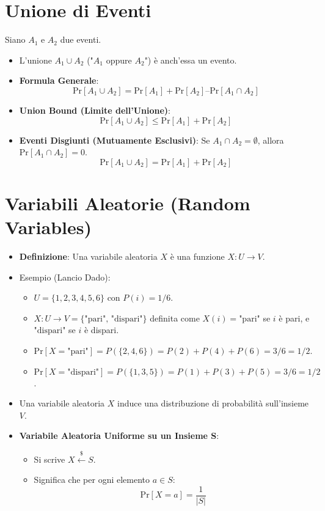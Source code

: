 \documentclass{article}
\begin{document}
\section{Unione di Eventi}
Siano $A_1$ e $A_2$ due eventi.
\begin{itemize}
    \item L'unione $A_1 \cup A_2$ ("$A_1$ oppure $A_2$") è anch'essa un evento.
    \item \textbf{Formula Generale}:
    \[ \text{Pr}[A_1 \cup A_2] = \text{Pr}[A_1] + \text{Pr}[A_2] – \text{Pr}[A_1 \cap A_2] \]
    \item \textbf{Union Bound (Limite dell'Unione)}:
    \[ \text{Pr}[A_1 \cup A_2] \le \text{Pr}[A_1] + \text{Pr}[A_2] \]
    \item \textbf{Eventi Disgiunti (Mutuamente Esclusivi)}: Se $A_1 \cap A_2 = \emptyset$, allora $\text{Pr}[A_1 \cap A_2] = 0$.
    \[ \text{Pr}[A_1 \cup A_2] = \text{Pr}[A_1] + \text{Pr}[A_2] \]
\end{itemize}

\section{Variabili Aleatorie (Random Variables)}
\begin{itemize}
    \item \textbf{Definizione}: Una variabile aleatoria $X$ è una funzione $X : U \to V$.
    \item Esempio (Lancio Dado):
    \begin{itemize}
        \item $U = \{1, 2, 3, 4, 5, 6\}$ con $P(i) = 1/6$.
        \item $X: U \to V=\{\text{"pari", "dispari"}\}$ definita come $X(i) = \text{"pari"}$ se $i$ è pari, e $\text{"dispari"}$ se $i$ è dispari.
        \item $\text{Pr}[X=\text{"pari"}] = P(\{2, 4, 6\}) = P(2)+P(4)+P(6) = 3/6 = 1/2$.
        \item $\text{Pr}[X=\text{"dispari"}] = P(\{1, 3, 5\}) = P(1)+P(3)+P(5) = 3/6 = 1/2$.
    \end{itemize}
    \item Una variabile aleatoria $X$ induce una distribuzione di probabilità sull'insieme $V$.
    \item \textbf{Variabile Aleatoria Uniforme su un Insieme S}:
    \begin{itemize}
        \item Si scrive $X \stackrel{\$}{\leftarrow} S$.
        \item Significa che per ogni elemento $a \in S$:
        \[ \text{Pr}[X=a] = \frac{1}{|S|} \]
    \end{itemize}
\end{itemize}
\end{document}
